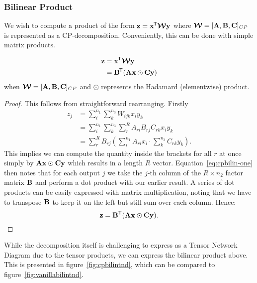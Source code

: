 {\subsubsection{Bilinear Product}
We wish to compute a product of the form \(\mathbf{z} = \mathbf{x}^{\mkern-1.5mu\mathsf{T}}\bm{\mathcal{W}}\mathbf{y}\)
where \(\bm{\mathcal{W}} = [\mathbf{A}, \mathbf{B}, \mathbf{C}]_{CP}\) is represented as a CP-decomposition.
Conveniently, this can be done with simple matrix products.

\begin{prop} \label{prop:cpbilin}
\begin{align}
	\mathbf{z} &= \mathbf{x}^{\mkern-1.5mu\mathsf{T}}\bm{\mathcal{W}}\mathbf{y} \\
			&= \mathbf{B}^{\mkern-1.5mu\mathsf{T}}(\mathbf{A}\mathbf{x} \odot \mathbf{C}\mathbf{y})
\end{align}
when \(\bm{\mathcal{W}} = [\mathbf{A}, \mathbf{B}, \mathbf{C}]_{CP}\) and \(\odot\) represents the Hadamard
(elementwise) product.
\end{prop}
\begin{proof}
This follows from straightforward rearranging. Firstly
\begin{align}
	z_j &= \sum_{i}^{n_1} \sum_k^{n_3} W_{ijk} x_i y_k \\
		&= \sum_{i}^{n_1} \sum_k^{n_3} \sum_r^R A_{ri} B_{rj} C_{rk} x_i y_k\\\label{eq:cpbilin-one}
		&= \sum_r^R B_{rj} \left( \sum_i^{n_1} A_{ri} x_i \cdot \sum_k^{n_3} C_{rk}y_k \right).
\end{align}
This implies we can compute the quantity inside the brackets for all \(r\) at once simply
by \(\mathbf{A}\mathbf{x} \odot \mathbf{C}\mathbf{y}\) which results in a length \(R\) vector. 
Equation~\eqref{eq:cpbilin-one} then notes that for each output \(j\) we take the \(j\)-th column
of the \(R \times n_2\) factor matrix \(\mathbf{B}\) and perform a dot product with our earlier
result. A series of dot products can be easily expressed with matrix multiplication, noting
that we have to transpose \(\mathbf{B}\) to keep it on the left but still sum over each column.
Hence:
\begin{equation}
	\mathbf{z} = \mathbf{B}^\mathsf{T} (\mathbf{A}\mathbf{x} \odot \mathbf{C}\mathbf{y}).
\end{equation}
\end{proof}

While the decomposition itself is challenging to express as a Tensor Network Diagram due to the
tensor products, we can express the bilinear product above. This is presented in 
figure~\ref{fig:cpbilintnd}, which can be compared to figure~\ref{fig:vanillabilintnd}.

}
